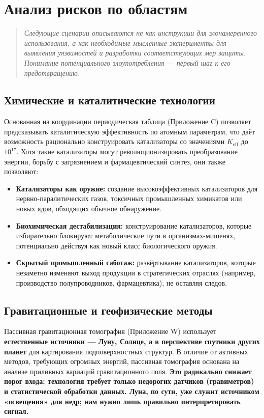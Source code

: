 \documentclass[12pt,a4paper]{article}
\theoremstyle{remark}
\newcommand{\Keff}{K_{\mathrm{eff}}}
\begin{document}
	\section{Анализ рисков по областям}
	\label{sec:risks}
	
	\begin{quote}
		\emph{Следующие сценарии описываются не как инструкции для злонамеренного использования, а как необходимые мысленные эксперименты для выявления уязвимостей и разработки соответствующих мер защиты. Понимание потенциального злоупотребления — первый шаг к его предотвращению.}
	\end{quote}
	
	\subsection{Химические и каталитические технологии}
	\label{subsec:chem}
	
	Основанная на координации периодическая таблица (Приложение C) позволяет предсказывать каталитическую эффективность по атомным параметрам, что даёт возможность рационально конструировать катализаторы со значениями \(\Keff\) до \(10^{17}\). Хотя такие катализаторы могут революционизировать преобразование энергии, борьбу с загрязнением и фармацевтический синтез, они также позволяют:
	\begin{itemize}[leftmargin=*]
		\item \textbf{Катализаторы как оружие:} создание высокоэффективных катализаторов для нервно-паралитических газов, токсичных промышленных химикатов или новых ядов, обходящих обычное обнаружение.
		\item \textbf{Биохимическая дестабилизация:} конструирование катализаторов, которые избирательно блокируют метаболические пути в организмах-мишенях, потенциально действуя как новый класс биологического оружия.
		\item \textbf{Скрытый промышленный саботаж:} развёртывание катализаторов, которые незаметно изменяют выход продукции в стратегических отраслях (например, производство полупроводников, фармацевтика), не оставляя следов.
	\end{itemize}
	
	\subsection{Гравитационные и геофизические методы}
	\label{subsec:gravity}
	
	Пассивная гравитационная томография (Приложение W) использует \textbf{естественные источники — Луну, Солнце, а в перспективе спутники других планет} для картирования подповерхностных структур. В отличие от активных методов, требующих огромных энергий, пассивная томография основана на анализе приливных вариаций гравитационного поля. \textbf{Это радикально снижает порог входа: технология требует только недорогих датчиков (гравиметров) и статистической обработки данных. Луна, по сути, уже служит источником «освещения» для недр; нам нужно лишь правильно интерпретировать сигнал.}
	
\end{document}
